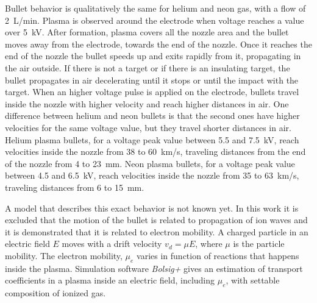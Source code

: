Bullet behavior is qualitatively the same for helium and neon gas, with a flow of \SI{2}{\liter/\minute}.
Plasma is observed around the electrode when voltage reaches a value over \SI{5}{\kilo\volt}. After formation, plasma covers all the nozzle area and the bullet moves away from the electrode, towards the end of the nozzle. Once it reaches the end of the nozzle the bullet speeds up and exits rapidly from it, propagating in the air outside. If there is not a target or if there is an insulating target, the bullet propagates in air decelerating until it stops or until the impact with the target.
When an higher voltage pulse is applied on the electrode, bullets travel inside the nozzle with higher velocity and reach higher distances in air. One difference between helium and neon bullets is that the second ones have higher velocities for the same voltage value, but they travel shorter distances in air. Helium plasma bullets, for a voltage peak value between \num{5.5} and \SI{7.5}{\kilo\volt}, reach velocities inside the nozzle from \num{38} to \SI{60}{\kilo\meter/\second}, traveling distances from the end of the nozzle from \num{4} to \SI{23}{\milli\meter}. Neon plasma bullets, for a voltage peak value between \num{4.5} and \SI{6.5}{\kilo\volt}, reach velocities inside the nozzle from \num{35} to \SI{63}{\kilo\meter/\second}, traveling distances from \num{6} to \SI{15}{\milli\meter}.

A model that describes this exact behavior is not known yet. In this work it is excluded that the motion of the bullet is related to propagation of ion waves and it is demonstrated that it is related to electron mobility. A charged particle in an electric field $E$ moves with a drift velocity $v_{d} = \mu E$, where $\mu$ is the particle mobility. The electron mobility, $\mu_e$ varies in function of reactions that happens inside the plasma. Simulation software \emph{Bolsig+} gives an estimation of transport coefficients in a plasma inside an electric field, including $\mu_e$, with settable composition of ionized gas.

